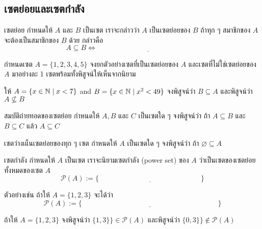\subsection{เซตย่อยและเซตกำลัง}
\begin{defn}{เซตย่อย}{}
	กำหนดให้ $A$ และ $B$ เป็นเซต เราจะกล่าวว่า $A$ เป็นเซตย่อยของ $B$ ถ้าทุก ๆ สมาชิกของ $A$ จะต้องเป็นสมาชิกของ $B$ ด้วย กล่าวคือ
	$$
	A\subseteq B \iff \underline{\hspace{6cm}}
	$$
\end{defn}

\begin{exam}
	กำหนดเซต $A = \{1,2,3,4,5\}$
	จงยกตัวอย่างเซตที่เป็นเซตย่อยของ $A$ และเซตที่ไม่ใช่เซตย่อยของ $A$ มาอย่างละ 1 เซตพร้อมทั้งพิสูจน์ให้เห็นจากนิยาม
\end{exam}
\vspace{5cm}

\begin{exer}
	{}{}
	ให้ $A = \{ x\in \mathbb{N} \mid x < 7\}$ and $B = \{ x\in \mathbb{N} \mid x^2 < 49\}$
	จงพิสูจน์ว่า $B\subseteq A$ และพิสูจน์ว่า $A \nsubseteq B$
\end{exer}
\vspace{5cm}

\newpage
\begin{exer}
	{สมบัติถ่ายทอดของเซตย่อย}{}
	กำหนดให้ $A, B$ และ $C$ เป็นเซตใด ๆ จงพิสูจน์ว่า ถ้า $A \subseteq B$ และ $B \subseteq C$ แล้ว $A \subseteq C$
\end{exer}
\vspace{7cm}

\begin{exer}
	{เซตว่างเแ็นเซตย่อยของทุก ๆ เซต}{}
	กำหนดให้ $A$ เป็นเซตใด ๆ จงพิสูจน์ว่า ถ้า $\varnothing \subseteq A$
\end{exer}
\vspace{5cm}

\newpage
\begin{defn}{เซตกำลัง}{}
	กำหนดให้ $A$ เป็นเซต เราจะนิยามเซตกำลัง (power set) ของ $A$ ว่าเป็นเซตของเซตย่อยทั้งหมดของเซต $A$
	$$
	\mathcal{P}(A) := \{\underline{\hspace{6cm}}\}
	$$
\end{defn}
ตัวอย่างเช่น ถ้าให้ $A = \{1,2,3\}$ จะได้ว่า $$\mathcal{P}(A) := \{\underline{\hspace{8cm}}\}$$
\begin{exer}
	{}{}
	ถ้าให้ $A = \{1,2,3\}$
	จงพิสูจน์ว่า $\{1,3\}\}\in\mathcal{P}(A)$ และพิสูจน์ว่า $\{0,3\}\}\notin\mathcal{P}(A)$
\end{exer}
\vspace{2cm}

